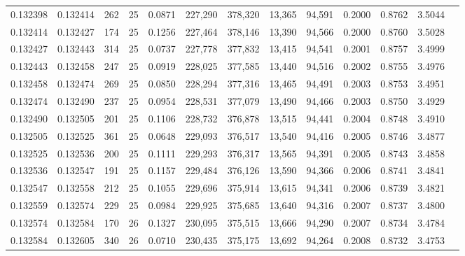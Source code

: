 \begin{tabular}{rrrrrrrrrrrrr}
0.132398 & 0.132414 &   262 &  25 &                                     0.0871 & 227,290 & 378,320 &  13,365 &  94,591 & 0.2000 & 0.8762 & 3.5044 \\
0.132414 & 0.132427 &   174 &  25 &                                     0.1256 & 227,464 & 378,146 &  13,390 &  94,566 & 0.2000 & 0.8760 & 3.5028 \\
0.132427 & 0.132443 &   314 &  25 &                                     0.0737 & 227,778 & 377,832 &  13,415 &  94,541 & 0.2001 & 0.8757 & 3.4999 \\
0.132443 & 0.132458 &   247 &  25 &                                     0.0919 & 228,025 & 377,585 &  13,440 &  94,516 & 0.2002 & 0.8755 & 3.4976 \\
0.132458 & 0.132474 &   269 &  25 &                                     0.0850 & 228,294 & 377,316 &  13,465 &  94,491 & 0.2003 & 0.8753 & 3.4951 \\
0.132474 & 0.132490 &   237 &  25 &                                     0.0954 & 228,531 & 377,079 &  13,490 &  94,466 & 0.2003 & 0.8750 & 3.4929 \\
0.132490 & 0.132505 &   201 &  25 &                                     0.1106 & 228,732 & 376,878 &  13,515 &  94,441 & 0.2004 & 0.8748 & 3.4910 \\
0.132505 & 0.132525 &   361 &  25 &                                     0.0648 & 229,093 & 376,517 &  13,540 &  94,416 & 0.2005 & 0.8746 & 3.4877 \\
0.132525 & 0.132536 &   200 &  25 &                                     0.1111 & 229,293 & 376,317 &  13,565 &  94,391 & 0.2005 & 0.8743 & 3.4858 \\
0.132536 & 0.132547 &   191 &  25 &                                     0.1157 & 229,484 & 376,126 &  13,590 &  94,366 & 0.2006 & 0.8741 & 3.4841 \\
0.132547 & 0.132558 &   212 &  25 &                                     0.1055 & 229,696 & 375,914 &  13,615 &  94,341 & 0.2006 & 0.8739 & 3.4821 \\
0.132559 & 0.132574 &   229 &  25 &                                     0.0984 & 229,925 & 375,685 &  13,640 &  94,316 & 0.2007 & 0.8737 & 3.4800 \\
0.132574 & 0.132584 &   170 &  26 &                                     0.1327 & 230,095 & 375,515 &  13,666 &  94,290 & 0.2007 & 0.8734 & 3.4784 \\
0.132584 & 0.132605 &   340 &  26 &                                     0.0710 & 230,435 & 375,175 &  13,692 &  94,264 & 0.2008 & 0.8732 & 3.4753 \\

\end{tabular}

